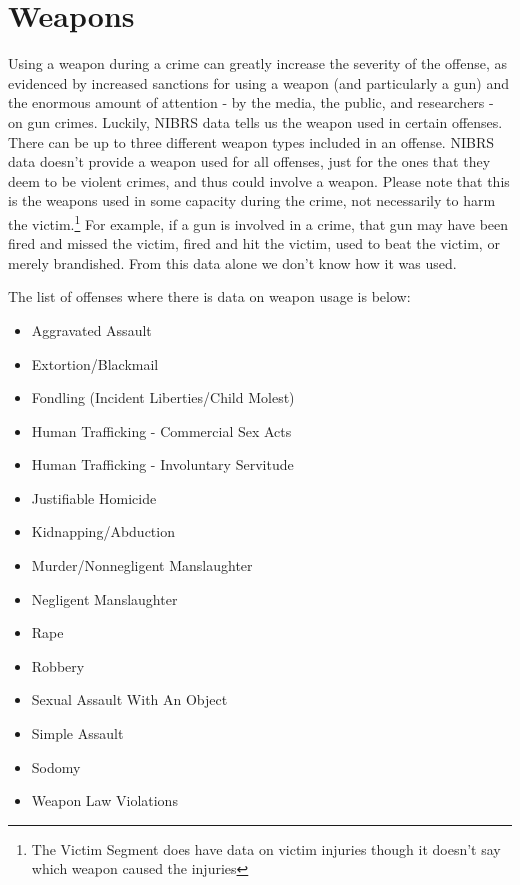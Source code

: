 \documentclass[
]{krantz}
\providecommand{\tightlist}{%
  \setlength{\itemsep}{0pt}\setlength{\parskip}{0pt}}
\begin{document}
\section{Weapons}\label{offenseWeapons}

Using a weapon during a crime can greatly increase the
severity of the offense, as evidenced by increased sanctions
for using a weapon (and particularly a gun) and the enormous
amount of attention - by the media, the public, and
researchers - on gun crimes. Luckily, NIBRS data tells us
the weapon used in certain offenses. There can be up to
three different weapon types included in an offense. NIBRS
data doesn't provide a weapon used for all offenses, just
for the ones that they deem to be violent crimes, and thus
could involve a weapon. Please note that this is the weapons
used in some capacity during the crime, not necessarily to
harm the victim.\footnote{The Victim Segment does have data
  on victim injuries though it doesn't say which weapon
  caused the injuries} For example, if a gun is involved in
a crime, that gun may have been fired and missed the victim,
fired and hit the victim, used to beat the victim, or merely
brandished. From this data alone we don't know how it was
used.

The list of offenses where there is data on weapon usage is
below:

\begin{itemize}
\tightlist
\item
  Aggravated Assault
\item
  Extortion/Blackmail
\item
  Fondling (Incident Liberties/Child Molest)
\item
  Human Trafficking - Commercial Sex Acts
\item
  Human Trafficking - Involuntary Servitude
\item
  Justifiable Homicide
\item
  Kidnapping/Abduction
\item
  Murder/Nonnegligent Manslaughter
\item
  Negligent Manslaughter
\item
  Rape
\item
  Robbery
\item
  Sexual Assault With An Object
\item
  Simple Assault
\item
  Sodomy
\item
  Weapon Law Violations
\end{itemize}
\end{document}
